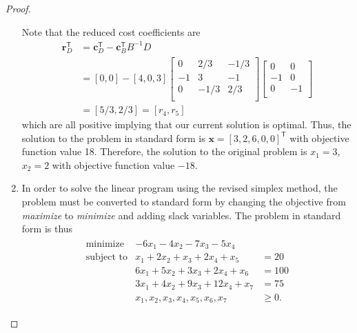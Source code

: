 \documentclass[12pt]{article}
\theoremstyle{definition}
\newcommand{\vect}[1]{\boldsymbol{#1}}
\newcommand{\tran}{\mathsf{T}}
\begin{document}
\begin{proof}
\begin{enumerate}
      Note that the reduced cost coefficients are
      \begin{align*}
        \vect{r}_D^\tran &= \vect{c}_D^\tran - \vect{c}_B^\tran B^{-1} D \\
        &= [0, 0] - [4, 0, 3]
        \begin{bmatrix}
          0 & 2/3 & -1/3\\
          -1 & 3 & -1\\
          0 & -1/3 & 2/3\\
        \end{bmatrix}
        \begin{bmatrix}
          0 & 0 \\
          -1 & 0 \\
          0 & -1 \\
        \end{bmatrix} \\
        &= [5/3, 2/3] = [r_4,r_5]
      \end{align*}
      which are all positive implying that our current solution is optimal.
      Thus, the solution to the problem in standard form is $\vect{x} = [3,2,6,0,0]^\tran$
      with objective function value 18. Therefore, the solution to the original problem
      is $x_1 = 3$, $x_2 = 2$ with objective function value $-18$.

    \item In order to solve the linear program using the revised simplex method,
      the problem must be converted to standard form by changing the objective
      from \textit{maximize} to \textit{minimize} and adding slack variables.
      The problem in standard form is thus
      \begin{align*}
        \begin{array}{rrl}
          \text{minimize} & -6x_1 - 4x_2 - 7x_3 - 5x_4  &\\
          \text{subject to}
          & x_1 + 2x_2 + x_3 + 2x_4 + x_5 &= 20 \\
          & 6x_1 + 5x_2 + 3x_3 + 2x_4 + x_6 &= 100 \\
          & 3x_1 + 4x_2 + 9x_3 + 12x_4 + x_7 &= 75 \\
          & x_1, x_2, x_3, x_4, x_5, x_6, x_7 &\geq 0.
        \end{array}
      \end{align*}


\end{enumerate}
\end{proof}
\end{document}
